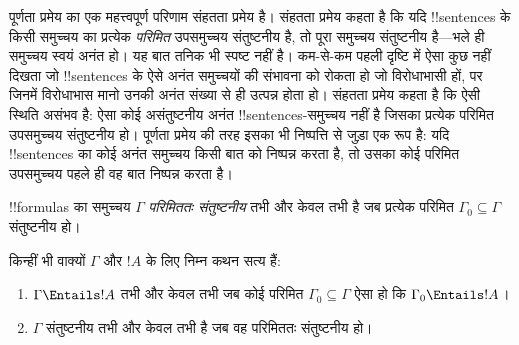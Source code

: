 \documentclass[../../../include/open-logic-section]{subfiles}
\begin{document}
      {}
      {}


पूर्णता प्रमेय का एक महत्त्वपूर्ण परिणाम संहतता प्रमेय है। संहतता प्रमेय
कहता है कि यदि !!{sentence}s के किसी समुच्चय का प्रत्येक \emph{परिमित}
उपसमुच्चय संतुष्टनीय है, तो पूरा समुच्चय संतुष्टनीय है---भले ही समुच्चय
स्वयं अनंत हो। यह बात तनिक भी स्पष्ट नहीं है। कम-से-कम पहली दृष्टि में ऐसा
कुछ नहीं दिखता जो !!{sentence}s के ऐसे अनंत समुच्चयों की संभावना को रोकता
हो जो विरोधाभासी हों, पर जिनमें विरोधाभास मानो उनकी अनंत संख्या से ही
उत्पन्न होता हो। संहतता प्रमेय कहता है कि ऐसी स्थिति असंभव है: ऐसा कोई
असंतुष्टनीय अनंत !!{sentence}s-समुच्चय नहीं है जिसका प्रत्येक परिमित
उपसमुच्चय संतुष्टनीय हो। पूर्णता प्रमेय की तरह इसका भी निष्पत्ति से जुड़ा
एक रूप है: यदि !!{sentence}s का कोई अनंत समुच्चय किसी बात को निष्पन्न करता
है, तो उसका कोई परिमित उपसमुच्चय पहले ही वह बात निष्पन्न करता है।

\begin{defn}
  !!{formula}s का समुच्चय $\Gamma$ \emph{परिमिततः संतुष्टनीय} तभी और केवल
  तभी है जब प्रत्येक परिमित $\Gamma_0 \subseteq \Gamma$ संतुष्टनीय हो।
\end{defn}

\begin{thm}[संहतता प्रमेय]
किन्हीं भी वाक्यों $\Gamma$ और $!A$ के लिए निम्न कथन सत्य हैं:
\begin{enumerate}
  \item $\Gamma \Entails !A$ तभी और केवल तभी जब कोई परिमित $\Gamma_0
    \subseteq \Gamma$ ऐसा हो कि $\Gamma_0 \Entails !A$।
  \item $\Gamma$ संतुष्टनीय तभी और केवल तभी है जब वह परिमिततः संतुष्टनीय
    हो।
\end{enumerate}
\end{thm}
\end{document}
